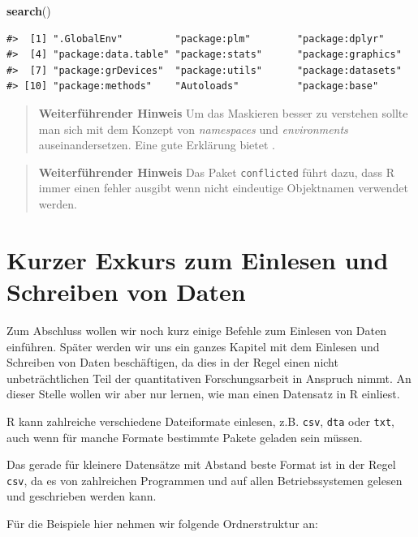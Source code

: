 \documentclass[]{book}
\newenvironment{Shaded}{\begin{snugshade}}{\end{snugshade}}
\newcommand{\KeywordTok}[1]{\textcolor[rgb]{0.13,0.29,0.53}{\textbf{#1}}}
\newcommand{\NormalTok}[1]{#1}
\begin{document}
\begin{Shaded}
\begin{Highlighting}[]
\KeywordTok{search}\NormalTok{()}
\end{Highlighting}
\end{Shaded}

\begin{verbatim}
#>  [1] ".GlobalEnv"         "package:plm"        "package:dplyr"     
#>  [4] "package:data.table" "package:stats"      "package:graphics"  
#>  [7] "package:grDevices"  "package:utils"      "package:datasets"  
#> [10] "package:methods"    "Autoloads"          "package:base"
\end{verbatim}

\begin{quote}
\textbf{Weiterführender Hinweis} Um das Maskieren besser zu verstehen
sollte man sich mit dem Konzept von \emph{namespaces} und
\emph{environments} auseinandersetzen. Eine gute Erklärung bietet
\citet{Packages}.
\end{quote}

\begin{quote}
\textbf{Weiterführender Hinweis} Das Paket \texttt{conflicted} führt
dazu, dass R immer einen fehler ausgibt wenn nicht eindeutige
Objektnamen verwendet werden.
\end{quote}

\section{Kurzer Exkurs zum Einlesen und Schreiben von
Daten}\label{kurzer-exkurs-zum-einlesen-und-schreiben-von-daten}

Zum Abschluss wollen wir noch kurz einige Befehle zum Einlesen von Daten
einführen. Später werden wir uns ein ganzes Kapitel mit dem Einlesen und
Schreiben von Daten beschäftigen, da dies in der Regel einen nicht
unbeträchtlichen Teil der quantitativen Forschungsarbeit in Anspruch
nimmt. An dieser Stelle wollen wir aber nur lernen, wie man einen
Datensatz in R einliest.

R kann zahlreiche verschiedene Dateiformate einlesen, z.B. \texttt{csv},
\texttt{dta} oder \texttt{txt}, auch wenn für manche Formate bestimmte
Pakete geladen sein müssen.

Das gerade für kleinere Datensätze mit Abstand beste Format ist in der
Regel \texttt{csv}, da es von zahlreichen Programmen und auf allen
Betriebssystemen gelesen und geschrieben werden kann.

Für die Beispiele hier nehmen wir folgende Ordnerstruktur an:
\end{document}
